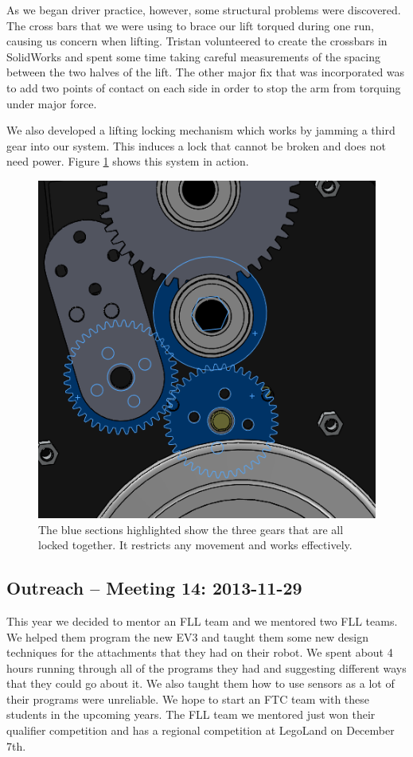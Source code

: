 As we began driver practice, however, some structural problems were discovered. The cross bars that we were using to brace our lift torqued during one run, causing us concern when lifting. Tristan volunteered to create the crossbars in SolidWorks and spent some time taking careful measurements of the spacing between the two halves of the lift. The other major fix that was incorporated was to add two points of contact on each side in order to stop the arm from torquing under major force.

We also developed a lifting locking mechanism which works by jamming a third gear into our system. This induces a lock that cannot be broken and does not need power. Figure \ref{locking} shows this system in action.

\begin{figure}[H]
\begin{center}
\includegraphics[scale=0.75]{images/Gearlock.png}
\end{center}
\caption{The blue sections highlighted show the three gears that are all locked together. It restricts any movement and works effectively.}
\label{locking}
\end{figure}

\newpage \subsection{Outreach -- Meeting 14: 2013-11-29}
This year we decided to mentor an FLL team and we mentored two FLL teams. We helped them program the new EV3 and taught them some new design techniques for the attachments that they had on their robot. We spent about 4 hours running through all of the programs they had and suggesting different ways that they could go about it. We also taught them how to use sensors as a lot of their programs were unreliable. We hope to start an FTC team with these students in the upcoming years. The FLL team we mentored just won their qualifier competition and has a regional competition at LegoLand on December 7th. 

